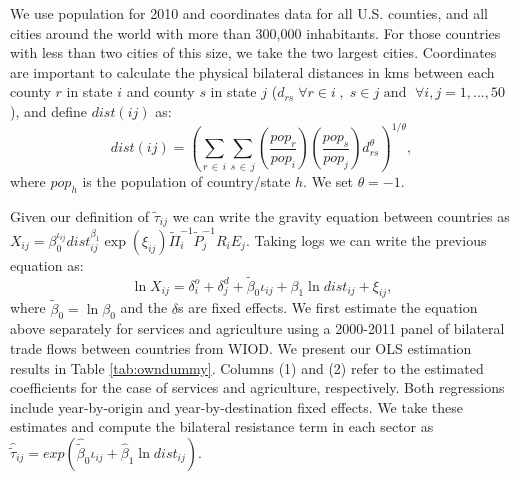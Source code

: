 \documentclass[12pt]{article}
\begin{document}
We use population for 2010 and coordinates data for all U.S. counties, and all cities around the world with more than 300,000 inhabitants. For those countries with less than two cities of this size, we take the two largest cities. Coordinates are important to calculate the physical bilateral distances in kms between each county $r$ in state $i$ and county $s$ in state $j$ ($d_{rs}\; \forall r\in i \; ,\; s\in j \text{ and }\;\forall i,j=1,...,50$), and define $dist\left(ij\right)$ as:
\begin{equation}
dist\left(ij\right) = \left(\sum_{r\, \in\, i} \sum_{s \, \in \, j} \left(\dfrac{pop_r}{pop_i}\right) \left(\dfrac{pop_s}{pop_j}\right) d_{rs}^\theta\right)^{1/ \theta},  \label{eq:distances}
\end{equation}
where $pop_h$ is the population of country/state $h$. We set $\theta=-1$.

Given our definition of $\tilde{\tau}_{ij}$ we can write the gravity equation between countries as $X_{ij}=\beta_{0}^{\iota_{ij}}dist_{ij}^{\beta_{1}}\exp\left(\xi_{ij}\right)\tilde{\Pi}_{i}^{-1}\tilde{P}_{j}^{-1}R_{i}E_{j}.$ Taking logs we can write the previous equation as: 
\begin{equation}
\ln X_{ij}=\delta_{i}^{o}+\delta_{j}^{d}+\tilde{\beta}_{0}\iota_{ij}+\beta_{1}\ln dist_{ij}+\xi_{ij}, \label{eq:gravity}
\end{equation}
where $\tilde{\beta}_{0}=\ln\beta_{0}$ and the $\delta$s are fixed effects. We first estimate the equation above separately for services and agriculture using a 2000-2011 panel of bilateral trade flows between countries from WIOD. We present our OLS estimation results in Table \ref{tab:owndummy}. Columns (1) and (2) refer to the estimated coefficients for the case of services and agriculture, respectively. Both regressions include year-by-origin and year-by-destination fixed effects. We take these estimates and compute the bilateral resistance term in each sector as $\hat{\tilde{\tau}}_{ij}=exp(\hat{\tilde{\beta}}_{0}\iota_{ij}+\hat{\beta}_{1}\ln dist_{ij})$. 
\end{document}
